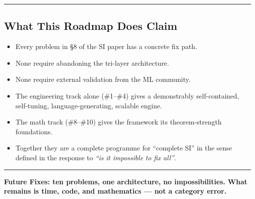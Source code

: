 \documentclass[
  11pt,
  a4paper,
]{article}
\providecommand{\tightlist}{%
  \setlength{\itemsep}{0pt}\setlength{\parskip}{0pt}}
\begin{document}
\begin{center}\rule{0.5\linewidth}{0.5pt}\end{center}

\subsection{What This Roadmap Does
Claim}\label{what-this-roadmap-does-claim}

\begin{itemize}
\tightlist
\item
  Every problem in §8 of the SI paper has a concrete fix path.
\item
  None require abandoning the tri-layer architecture.
\item
  None require external validation from the ML community.
\item
  The engineering track alone (\#1--\#4) gives a demonstrably
  self-contained, self-tuning, language-generating, scalable engine.
\item
  The math track (\#8--\#10) gives the framework its theorem-strength
  foundations.
\item
  Together they are a complete programme for ``complete SI'' in the
  sense defined in the response to \emph{``is it impossible to fix
  all''}.
\end{itemize}

\begin{center}\rule{0.5\linewidth}{0.5pt}\end{center}

\textbf{Future Fixes: ten problems, one architecture, no
impossibilities. What remains is time, code, and mathematics --- not a
category error.}
\end{document}
